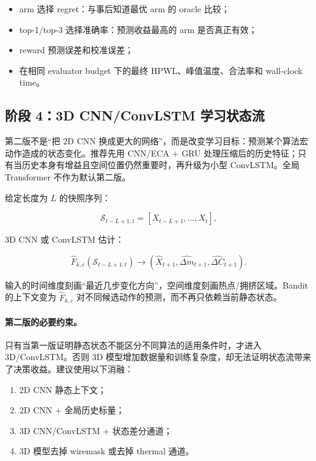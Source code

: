 \documentclass[UTF8,a4paper,11pt]{ctexart}
\begin{document}
\begin{itemize}
    \item arm 选择 regret：与事后知道最优 arm 的 oracle 比较；
    \item top-1/top-3 选择准确率：预测收益最高的 arm 是否真正有效；
    \item reward 预测误差和校准误差；
    \item 在相同 evaluator budget 下的最终 HPWL、峰值温度、合法率和 wall-clock time。
\end{itemize}

\subsection{阶段 4：3D CNN/ConvLSTM 学习状态流}

第二版不是“把 2D CNN 换成更大的网络”，而是改变学习目标：预测某个算法宏动作造成的状态变化。推荐先用 CNN/ECA + GRU 处理压缩后的历史特征；只有当历史本身有增益且空间位置仍然重要时，再升级为小型 ConvLSTM。全局 Transformer 不作为默认第二版。

给定长度为 \(L\) 的快照序列：

\begin{equation}
\mathcal{S}_{t-L+1:t}=[X_{t-L+1},\ldots,X_t],
\end{equation}

3D CNN 或 ConvLSTM 估计：

\begin{equation}
\widehat{F}_{k,c}(\mathcal{S}_{t-L+1:t})
\rightarrow
(\widehat{X}_{t+1},\widehat{\Delta m}_{t+1},\widehat{\Delta C}_{t+1}).
\end{equation}

输入的时间维度刻画“最近几步变化方向”，空间维度刻画热点/拥挤区域。Bandit 的上下文变为 \(\widehat{F}_{k,c}\) 对不同候选动作的预测，而不再只依赖当前静态状态。

\paragraph{第二版的必要约束。} 只有当第一版证明静态状态不能区分不同算法的适用条件时，才进入 3D/ConvLSTM。否则 3D 模型增加数据量和训练复杂度，却无法证明状态流带来了决策收益。建议使用以下消融：

\begin{enumerate}
    \item 2D CNN 静态上下文；
    \item 2D CNN + 全局历史标量；
    \item 3D CNN/ConvLSTM + 状态差分通道；
    \item 3D 模型去掉 wiremask 或去掉 thermal 通道。
\end{enumerate}
\end{document}
